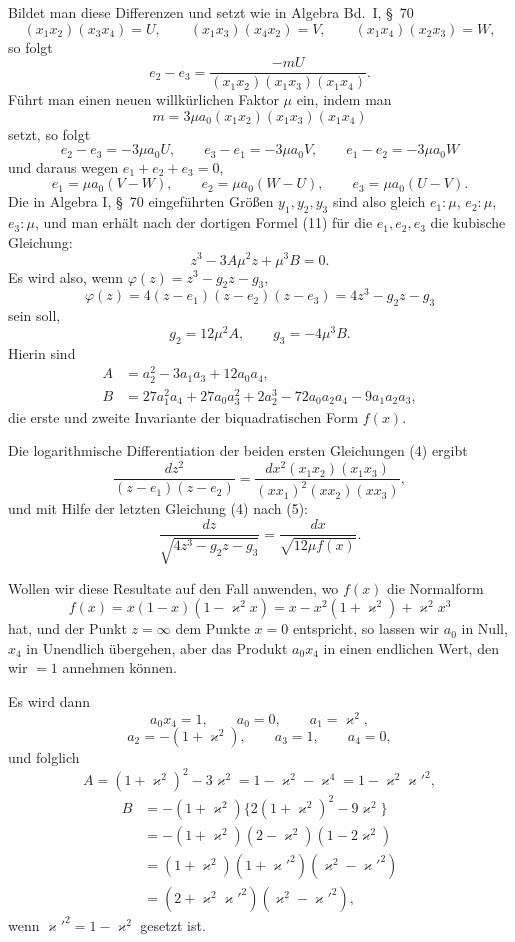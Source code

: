 \documentclass[11pt]{article}
\begin{document}
Bildet man diese Differenzen und setzt wie in Algebra Bd.~I, \S~70
\[
(x_1x_2)(x_3x_4)=U,\qquad (x_1x_3)(x_4x_2)=V,\qquad (x_1x_4)(x_2x_3)=W,
\]
so folgt
\[
e_2-e_3=\frac{-mU}{(x_1x_2)(x_1x_3)(x_1x_4)}.
\]
Führt man einen neuen willkürlichen Faktor $\mu$ ein, indem man
\begin{equation}
m=3\mu a_0(x_1x_2)(x_1x_3)(x_1x_4)
\tag{5}
\end{equation}
setzt, so folgt
\[
e_2-e_3=-3\mu a_0U,\qquad e_3-e_1=-3\mu a_0V,\qquad e_1-e_2=-3\mu a_0W
\]
und daraus wegen $e_1+e_2+e_3=0$,
\[
e_1=\mu a_0(V-W),\qquad e_2=\mu a_0(W-U),\qquad e_3=\mu a_0(U-V).
\]
Die in Algebra I, \S~70 eingeführten Größen $y_1,y_2,y_3$ sind also gleich $e_1:\mu$, $e_2:\mu$, $e_3:\mu$, und man erhält nach der dortigen Formel (11) für die $e_1,e_2,e_3$ die kubische Gleichung:
\[
z^3-3A\mu^2z+\mu^3B=0.
\]
Es wird also, wenn $\varphi(z)=z^3-g_2z-g_3$,
\[
\varphi(z)=4(z-e_1)(z-e_2)(z-e_3)=4z^3-g_2z-g_3
\]
sein soll,
\begin{equation}
g_2=12\mu^2A,\qquad g_3=-4\mu^3B.
\tag{6}
\end{equation}
Hierin sind
\begin{equation}
\begin{aligned}
A&=a_2^2-3a_1a_3+12a_0a_4,\\
B&=27a_1^2a_4+27a_0a_3^2+2a_2^3-72a_0a_2a_4-9a_1a_2a_3,
\end{aligned}
\tag{7}
\end{equation}
die erste und zweite Invariante der biquadratischen Form $f(x)$.

Die logarithmische Differentiation der beiden ersten Gleichungen (4) ergibt
\[
\frac{dz^2}{(z-e_1)(z-e_2)}=\frac{dx^2(x_1x_2)(x_1x_3)}{(xx_1)^2(xx_2)(xx_3)},
\]
und mit Hilfe der letzten Gleichung (4) nach (5):
\begin{equation}
\frac{dz}{\sqrt{4z^3-g_2z-g_3}}=\frac{dx}{\sqrt{12\mu f(x)}}.
\tag{8}
\end{equation}

Wollen wir diese Resultate auf den Fall anwenden, wo $f(x)$ die Normalform
\[
f(x)=x(1-x)(1-\varkappa^2x)=x-x^2(1+\varkappa^2)+\varkappa^2x^3
\]
hat, und der Punkt $z=\infty$ dem Punkte $x=0$ entspricht, so lassen wir $a_0$ in Null, $x_4$ in Unendlich übergehen, aber das Produkt $a_0x_4$ in einen endlichen Wert, den wir $=1$ annehmen können.

Es wird dann
\[
a_0x_4=1,\qquad a_0=0,\qquad a_1=\varkappa^2,
\]
\[
a_2=-(1+\varkappa^2),\qquad a_3=1,\qquad a_4=0,
\]
und folglich
\[
A=(1+\varkappa^2)^2-3\varkappa^2=1-\varkappa^2-\varkappa^4=1-\varkappa^2\varkappa'^2,
\]
\[
\begin{aligned}
B&=-(1+\varkappa^2)\{2(1+\varkappa^2)^2-9\varkappa^2\}\\
&=-(1+\varkappa^2)(2-\varkappa^2)(1-2\varkappa^2)\\
&=(1+\varkappa^2)(1+\varkappa'^2)(\varkappa^2-\varkappa'^2)\\
&=(2+\varkappa^2\varkappa'^2)(\varkappa^2-\varkappa'^2),
\end{aligned}
\]
wenn $\varkappa'^2=1-\varkappa^2$ gesetzt ist.
\end{document}

